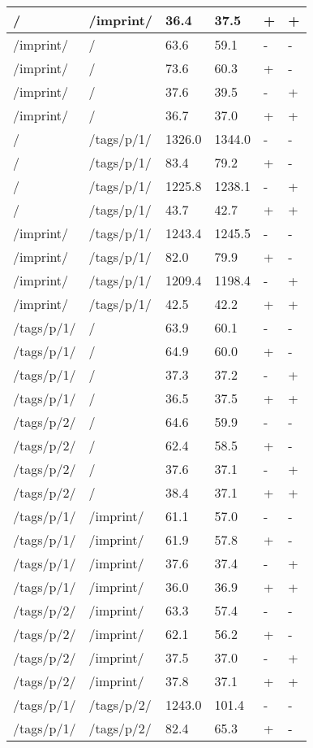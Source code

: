 \begin{appendix}
\begin{center}
\begin{longtable}{llllll}
/ & /imprint/ & 36.4 & 37.5 & + & + \\
\hline
/imprint/ & / & 63.6 & 59.1 & - & - \\
/imprint/ & / & 73.6 & 60.3 & + & - \\
/imprint/ & / & 37.6 & 39.5 & - & + \\
/imprint/ & / & 36.7 & 37.0 & + & + \\
\hline
\hline
/ & /tags/p/1/ & 1326.0 & 1344.0 & - & - \\
/ & /tags/p/1/ & 83.4 & 79.2 & + & - \\
/ & /tags/p/1/ & 1225.8 & 1238.1 & - & + \\
/ & /tags/p/1/ & 43.7 & 42.7 & + & + \\
\hline
/imprint/ & /tags/p/1/ & 1243.4 & 1245.5 & - & - \\
/imprint/ & /tags/p/1/ & 82.0 & 79.9 & + & - \\
/imprint/ & /tags/p/1/ & 1209.4 & 1198.4 & - & + \\
/imprint/ & /tags/p/1/ & 42.5 & 42.2 & + & + \\
\hline
\hline
/tags/p/1/ & / & 63.9 & 60.1 & - & - \\
/tags/p/1/ & / & 64.9 & 60.0 & + & - \\
/tags/p/1/ & / & 37.3 & 37.2 & - & + \\
/tags/p/1/ & / & 36.5 & 37.5 & + & + \\
\hline
/tags/p/2/ & / & 64.6 & 59.9 & - & - \\
/tags/p/2/ & / & 62.4 & 58.5 & + & - \\
/tags/p/2/ & / & 37.6 & 37.1 & - & + \\
/tags/p/2/ & / & 38.4 & 37.1 & + & + \\
\hline
/tags/p/1/ & /imprint/ & 61.1 & 57.0 & - & - \\
/tags/p/1/ & /imprint/ & 61.9 & 57.8 & + & - \\
/tags/p/1/ & /imprint/ & 37.6 & 37.4 & - & + \\
/tags/p/1/ & /imprint/ & 36.0 & 36.9 & + & + \\
\hline
/tags/p/2/ & /imprint/ & 63.3 & 57.4 & - & - \\
/tags/p/2/ & /imprint/ & 62.1 & 56.2 & + & - \\
/tags/p/2/ & /imprint/ & 37.5 & 37.0 & - & + \\
/tags/p/2/ & /imprint/ & 37.8 & 37.1 & + & + \\
\hline
\hline
/tags/p/1/ & /tags/p/2/ & 1243.0 & 101.4 & - & - \\
/tags/p/1/ & /tags/p/2/ & 82.4 & 65.3 & + & - \\

\end{longtable}
\end{center}
\end{appendix}
